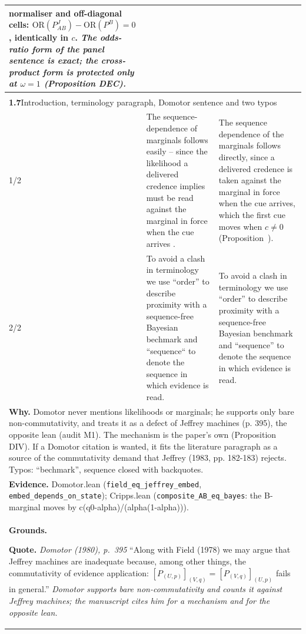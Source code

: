 \documentclass[10pt]{article}
\theoremstyle{definition}
\renewcommand{\ref}[1]{\textsc{\detokenize{#1}}}
\newlength{\fullw}\setlength{\fullw}{25.9cm}
\newcommand{\entryhead}[2]{\multicolumn{3}{|l|}{\rule{0pt}{2.6ex}\large\textbf{#1}\quad #2} \\ \hline}
\begin{document}
{\begin{longtable}{|p{0.9cm}|p{12.2cm}|p{12.2cm}|}
{normaliser and off-diagonal cells:
$\mathrm{OR}(P^J_{AB}) - \mathrm{OR}(P^B) = 0$, identically in $c$. \newline \textit{The odds-ratio form of the panel sentence is exact; the
cross-product form is protected only at $\omega=1$ (Proposition DEC).}} \\ \hline
\multicolumn{3}{|l|}{} \\ \hline
\entryhead{1.7}{Introduction, terminology paragraph, Domotor sentence and two typos\quad{\footnotesize\textit{(formerly C.7)}}}
1/2 & The sequence-dependence of marginals follows easily -- since the likelihood a delivered credence implies must be read against the marginal in force when the cue arrives \citep{Domotor1980}. & The sequence dependence of the marginals follows directly, since a delivered credence is taken against the marginal in force when the cue arrives, which the first cue moves when $c\neq0$ (Proposition~\ref{prop:DIV}). \\ \hline
2/2 & To avoid a clash in terminology we use ``order'' to describe proximity with a sequence-free Bayesian bechmark and ``sequence`` to denote the sequence in which evidence is read. & To avoid a clash in terminology we use ``order'' to describe proximity with a sequence-free Bayesian benchmark and ``sequence'' to denote the sequence in which evidence is read. \\ \hline
\multicolumn{3}{|p{\fullw}|}{\textbf{Why.} Domotor never mentions likelihoods or marginals; he supports only bare non-commutativity, and treats it as a defect of Jeffrey machines (p. 395), the opposite lean (audit M1). The mechanism is the paper's own (Proposition DIV). If a Domotor citation is wanted, it fits the literature paragraph as a source of the commutativity demand that Jeffrey (1983, pp. 182-183) rejects. Typos: ``bechmark'', \texttt{}sequence\texttt{} closed with backquotes.} \\
\multicolumn{3}{|p{\fullw}|}{\textbf{Evidence.} Domotor.lean (\texttt{field\_eq\_jeffrey\_embed}, \texttt{embed\_depends\_on\_state}); Cripps.lean (\texttt{composite\_AB\_eq\_bayes}: the B-marginal moves by c(q0-alpha)/(alpha(1-alpha))).} \\ \hline
\multicolumn{3}{|p{\fullw}|}{\textbf{Grounds.}\par \textbf{Quote.} \textit{Domotor (1980), p.~395} \newline ``Along with Field (1978) we may argue that Jeffrey machines are inadequate because,
among other things, the commutativity of evidence application:
$[P_{(U,p)}]_{(V,q)} = [P_{(V,q)}]_{(U,p)}$ fails in general.'' \newline \textit{Domotor supports bare non-commutativity and counts it against Jeffrey machines; the manuscript cites him for a mechanism and for the opposite lean.}} \\

\end{longtable}}
\end{document}
